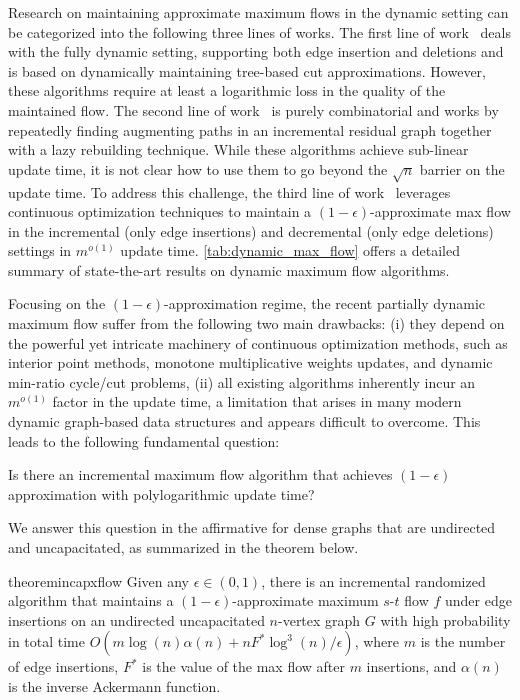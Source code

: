 \documentclass[11pt,a4paper]{article}
\newcommand{\eps}{\epsilon}
\begin{document}
Research on maintaining approximate maximum flows in the dynamic setting can be categorized into the following three lines of works. The first line of work~\cite{CGH20dynjtree, GRST21xhierarchy, vdBCK24decremental} deals with the fully dynamic setting, supporting both edge insertion and deletions and is based on dynamically maintaining tree-based cut approximations. However, these algorithms require at least a logarithmic loss in the quality of the maintained flow.
The second line of work~\cite{Hen97vertexconnectivity, GK21misflowmatch, GH23incflow} is purely combinatorial and works by repeatedly finding augmenting paths in an incremental residual graph together with a lazy rebuilding technique. While these algorithms achieve sub-linear update time, it is not clear how to use them to go beyond the $\sqrt{n}$ barrier on the update time.
To address this challenge, the third line of work~\cite{vdBLS23incmaxflow, vdBCK24incflow, CKL24incremental, vdBCK24decremental} leverages continuous optimization techniques to maintain a $(1-\eps)$-approximate max flow in the incremental (only edge insertions) and decremental (only edge deletions) settings in $m^{o(1)}$ update time. \cref{tab:dynamic_max_flow} offers a detailed summary of state-the-art results on dynamic maximum flow algorithms.

Focusing on the $(1-\eps)$-approximation regime, the recent partially dynamic maximum flow suffer from the following two main drawbacks: (i) they depend on the powerful yet intricate machinery of continuous optimization methods, such as interior point methods, monotone multiplicative weights updates, and dynamic min-ratio cycle/cut problems, (ii) all existing algorithms inherently incur an $m^{o(1)}$ factor in the update time, a limitation that arises in many modern dynamic graph-based data structures and appears difficult to overcome. This leads to the following fundamental question:

\begin{tcolorbox}
\begin{center}
Is there an incremental maximum flow algorithm that achieves $(1-\epsilon)$ approximation with polylogarithmic update time?
\end{center}
\end{tcolorbox}

We answer this question in the affirmative for dense graphs that are undirected and uncapacitated, as summarized in the theorem below.

\begin{restatable}{theorem}{incapxflow}
\label{thm:inc_apx_flow}
Given any $\eps \in (0,1)$, there is an incremental randomized algorithm that maintains a $(1-\eps)$-approximate maximum $s$-$t$ flow $f$ under edge insertions on an undirected uncapacitated $n$-vertex graph $G$ with high probability in total time $O(m \log(n) \alpha(n) + n F^* \log^3 (n)/\eps)$, where $m$ is the number of edge insertions, $F^*$ is the value of the max flow after $m$ insertions, and $\alpha(n)$ is the inverse Ackermann function.
\end{restatable}
\end{document}

